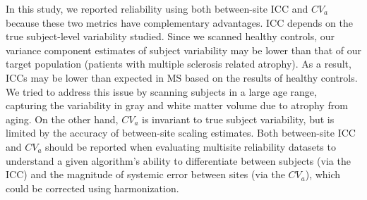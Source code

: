 In this study, we reported reliability using both between-site ICC and $CV_{a}$ because these two metrics have complementary advantages. ICC depends on the true subject-level variability studied. Since we scanned healthy controls, our variance component estimates of subject variability may be lower than that of our target population (patients with multiple sclerosis related atrophy). As a result, ICCs may be lower than expected in MS based on the results of healthy controls. We tried to address this issue by scanning subjects in a large age range, capturing the variability in gray and white matter volume due to atrophy from aging. On the other hand, $CV_{a}$ is invariant to true subject variability, but is limited by the accuracy of between-site scaling estimates. Both between-site ICC and $CV_{a}$ should be reported when evaluating multisite reliability datasets to understand a given algorithm's ability to differentiate between subjects (via the ICC) and the magnitude of systemic error between sites (via the $CV_{a}$), which could be corrected using harmonization.